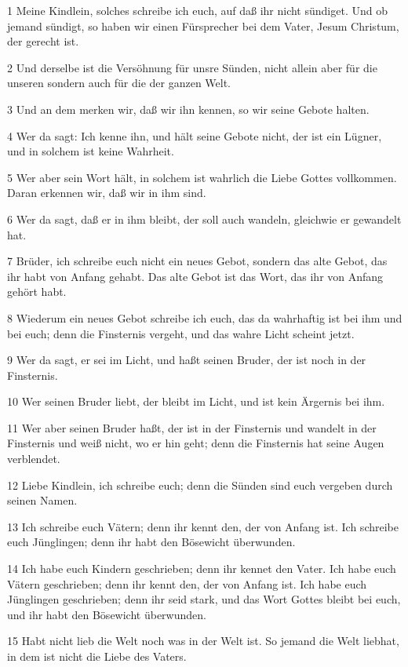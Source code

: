 \par 1 Meine Kindlein, solches schreibe ich euch, auf daß ihr nicht sündiget. Und ob jemand sündigt, so haben wir einen Fürsprecher bei dem Vater, Jesum Christum, der gerecht ist.
\par 2 Und derselbe ist die Versöhnung für unsre Sünden, nicht allein aber für die unseren sondern auch für die der ganzen Welt.
\par 3 Und an dem merken wir, daß wir ihn kennen, so wir seine Gebote halten.
\par 4 Wer da sagt: Ich kenne ihn, und hält seine Gebote nicht, der ist ein Lügner, und in solchem ist keine Wahrheit.
\par 5 Wer aber sein Wort hält, in solchem ist wahrlich die Liebe Gottes vollkommen. Daran erkennen wir, daß wir in ihm sind.
\par 6 Wer da sagt, daß er in ihm bleibt, der soll auch wandeln, gleichwie er gewandelt hat.
\par 7 Brüder, ich schreibe euch nicht ein neues Gebot, sondern das alte Gebot, das ihr habt von Anfang gehabt. Das alte Gebot ist das Wort, das ihr von Anfang gehört habt.
\par 8 Wiederum ein neues Gebot schreibe ich euch, das da wahrhaftig ist bei ihm und bei euch; denn die Finsternis vergeht, und das wahre Licht scheint jetzt.
\par 9 Wer da sagt, er sei im Licht, und haßt seinen Bruder, der ist noch in der Finsternis.
\par 10 Wer seinen Bruder liebt, der bleibt im Licht, und ist kein Ärgernis bei ihm.
\par 11 Wer aber seinen Bruder haßt, der ist in der Finsternis und wandelt in der Finsternis und weiß nicht, wo er hin geht; denn die Finsternis hat seine Augen verblendet.
\par 12 Liebe Kindlein, ich schreibe euch; denn die Sünden sind euch vergeben durch seinen Namen.
\par 13 Ich schreibe euch Vätern; denn ihr kennt den, der von Anfang ist. Ich schreibe euch Jünglingen; denn ihr habt den Bösewicht überwunden.
\par 14 Ich habe euch Kindern geschrieben; denn ihr kennet den Vater. Ich habe euch Vätern geschrieben; denn ihr kennt den, der von Anfang ist. Ich habe euch Jünglingen geschrieben; denn ihr seid stark, und das Wort Gottes bleibt bei euch, und ihr habt den Bösewicht überwunden.
\par 15 Habt nicht lieb die Welt noch was in der Welt ist. So jemand die Welt liebhat, in dem ist nicht die Liebe des Vaters.
